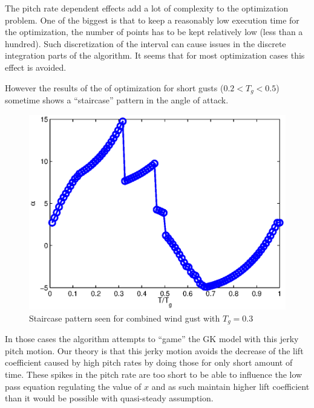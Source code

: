 \FloatBarrier
 \label{sub:staircase}
The pitch rate dependent effects add a lot of complexity to the optimization problem.
One of the biggest is that to keep a reasonably low execution time for the optimization, the number of points has to be kept relatively low (less than a hundred).
Such discretization of the interval can cause issues in the discrete integration parts of the algorithm.
It seems that for most optimization cases this effect is avoided.

\par However the results of the of optimization for short gusts ($0.2<T_g<0.5$) sometime shows a ``staircase'' pattern in the angle of attack.

\begin{figure}[h]
  \centering
  \includegraphics{./Figures/Alpha_vs_T_Windtype=3_Tg=0p3_GK_alphamax=20.eps}
  \caption{Staircase pattern seen for combined wind gust with $T_g=0.3$}
  \label{fig:staircase_case}
\end{figure}

\par In those cases the algorithm attempts to ``game'' the GK model with this jerky pitch motion.
Our theory is that this jerky motion avoids the decrease of the lift coefficient caused by high pitch rates by doing those for only short amount of time.
These spikes in the pitch rate are too short to be able to influence the low pass equation regulating the value of $x$ and as such maintain higher lift coefficient than it would be possible with quasi-steady assumption.

